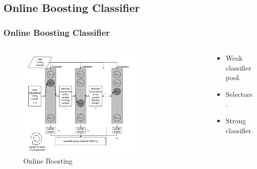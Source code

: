 \documentclass{beamer}
\begin{document}
\subsection{Online Boosting Classifier}
\begin{frame}
	\frametitle{Online Boosting Classifier}
	\begin{columns}[T]
		\begin{column}{0.6\textwidth}
		\begin{figure}
		\begin{center}
			\includegraphics[width=0.7\textwidth]{images/OnlineBoosting.png}
			\caption{Online Boosting}
		\end{center}
		\end{figure}
		\end{column}
		\begin{column}{0.4\textwidth}
			\begin{itemize}
				\item Weak classifier pool.
				\item Selectors.
				\item Strong classifier.
			\end{itemize}
		\end{column}
	\end{columns}
\end{frame}
\end{document}
